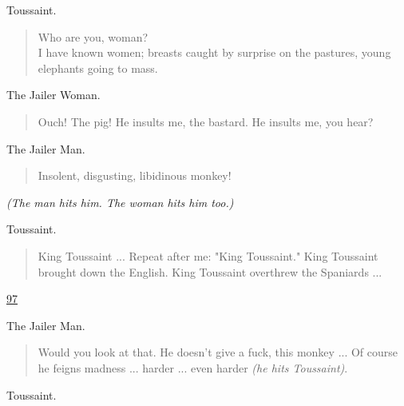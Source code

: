\documentclass[letterpaper,article,12pt,oneside,notitlepage]{memoir}
\begin{document}
\begin{center}Toussaint.\end{center}

\begin{verse}
Who are you, woman? \\
I have known women; breasts caught by surprise on the pastures, young elephants going to mass. \\
\end{verse}

\begin{center}The Jailer Woman.\end{center}

\begin{verse}
Ouch! The pig! He insults me, the bastard. He insults me, you hear? \\
\end{verse}

\begin{center}The Jailer Man.\end{center}

\begin{verse}
Insolent, disgusting, libidinous monkey! \\
\end{verse}

\textit{(The man hits him. The woman hits him too.)}

\begin{center}Toussaint.\end{center}

\begin{verse}
\indent King Toussaint ... Repeat after me: "King Toussaint." King Toussaint brought down the English. King Toussaint overthrew the Spaniards ...  \\
\end{verse}

\clearpage

\href{http://cesaire.elotroalex.com/chiens/chiens/p097.html}{97}

\begin{center}The Jailer Man.\end{center}

\begin{verse}
\indent Would you look at that. He doesn't give a fuck, this monkey ... Of course he feigns madness ... harder ... even harder \textit{(he hits Toussaint)}.  \\
\end{verse}

\begin{center}Toussaint.\end{center}
\end{document}

